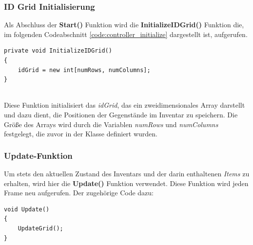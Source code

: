\subsubsection{ID Grid Initialisierung}
Als Abschluss der \textbf{Start()} Funktion wird die \textbf{InitializeIDGrid()} Funktion die, im folgenden Codeabschnitt
\ref{code:controller_initialize} dargestellt ist, aufgerufen.
\begin{lstlisting}[style=csharp, caption={Initialisierung des idGrids}, label=code:controller_initialize]
private void InitializeIDGrid()
{
    idGrid = new int[numRows, numColumns];
}
\end{lstlisting}\\
Diese Funktion initialisiert das \textit{idGrid}, das ein zweidimensionales Array darstellt und dazu dient, die Positionen
der Gegenstände im Inventar zu speichern. Die Größe des Arrays wird durch die Variablen \textit{numRows} und \textit{numColumns}
festgelegt, die zuvor in der Klasse definiert wurden.

\subsubsection{Update-Funktion}
Um stets den aktuellen Zustand des Inventars und der darin enthaltenen \textit{Items} zu erhalten, wird hier die \textbf{Update()}
Funktion verwendet. Diese Funktion wird jeden Frame neu aufgerufen. Der zugehörige Code dazu:
\begin{lstlisting}[style=csharp, caption={Initialisierung des idGrids}, label=code:controller_update]
void Update()
{
    UpdateGrid();
}
\end{lstlisting}

